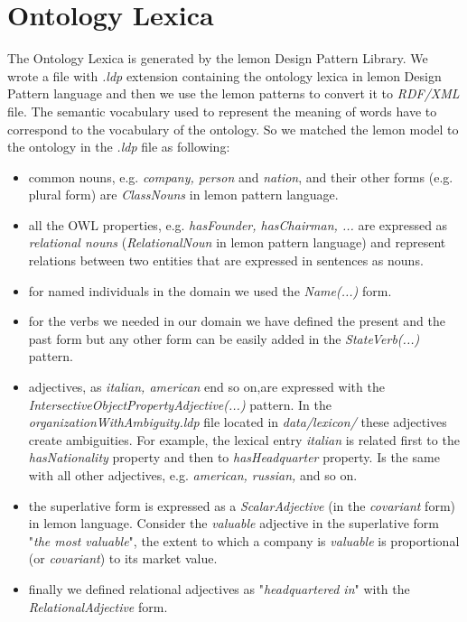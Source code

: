 \section{Ontology Lexica}
\label{sec:ontology-lexica}


The Ontology Lexica is generated by the lemon Design Pattern Library. We wrote a file with \textit{.ldp} extension containing the ontology lexica in lemon Design Pattern language and then we use the lemon patterns to convert it to \textit{RDF/XML} file. 
The semantic vocabulary used to represent the meaning of words have to correspond to the vocabulary of the ontology. So we matched the lemon model to the ontology in the \textit{.ldp} file as following:
\begin{itemize}
\item common nouns, e.g. \textit{company, person} and \textit{nation}, and their other forms (e.g. plural form) are \textit{ClassNouns} in lemon pattern language.
\item all the OWL properties, e.g. \textit{hasFounder, hasChairman, ...} are expressed as \textit{relational nouns} (\textit{RelationalNoun} in lemon pattern language) and represent relations between two entities that are expressed in sentences as nouns.
\item for named individuals in the domain we used the \textit{Name(...)} form.
\item for the verbs we needed in our domain we have defined the present and the past form but any other form can be easily added in the \textit{StateVerb(...)} pattern.
\item adjectives, as \textit{italian, american} end so on,are expressed with the \textit{IntersectiveObjectPropertyAdjective(...)} pattern. In the \textit{organizationWithAmbiguity.ldp} file located in \textit{data/lexicon/} these adjectives create ambiguities. For example, the lexical entry \textit{italian} is related first to the \textit{hasNationality} property and then to \textit{hasHeadquarter} property. Is the same with all other adjectives, e.g. \textit{american, russian,} and so on. 
\item the superlative form is expressed as a \textit{ScalarAdjective} (in the \textit{covariant} form) in lemon language. Consider the \textit{valuable} adjective in the superlative form "\textit{the most valuable}", the extent to which a company is \textit{valuable} is proportional (or \textit{covariant}) to its market value.
\item finally we defined relational adjectives as "\textit{headquartered in}" with the \textit{RelationalAdjective} form.
\end{itemize}
